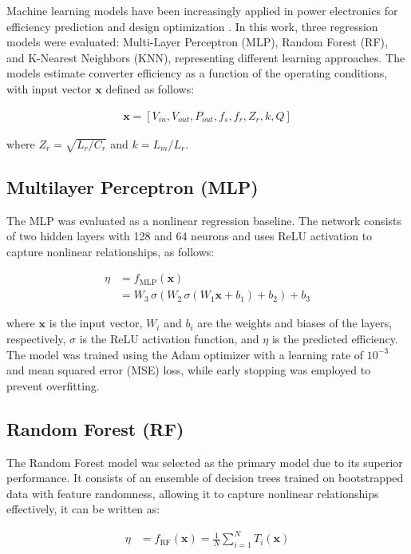 Machine learning models have been increasingly applied in power electronics for efficiency prediction and design optimization \cite{zhao2019}. In this work, three regression models were evaluated: Multi-Layer Perceptron (MLP), Random Forest (RF), and K-Nearest Neighbors (KNN), representing different learning approaches. The models estimate converter efficiency as a function of the operating conditions, with input vector $\mathbf{x}$ defined as follows:

\begin{align}
    \mathbf{x} = [V_{in}, V_{out}, P_{out}, f_s, f_r, Z_r, k, Q]
\end{align}

\noindent
where $Z_r = \sqrt{L_r/C_r}$ and $k = L_m / L_r$.

\subsection{Multilayer Perceptron (MLP)}

The MLP was evaluated as a nonlinear regression baseline. The network consists of two hidden layers with 128 and 64 neurons and uses ReLU activation to capture nonlinear relationships, as follows:

\begin{align}
\eta &= f_{\mathrm{MLP}}(\mathbf{x}) \nonumber \\
     &= W_3\,\sigma\!\left(W_2\,\sigma\!\left(W_1 \mathbf{x} + b_1\right) + b_2\right) + b_3
\end{align}

\noindent where $\mathbf{x}$ is the input vector, $W_i$ and $b_i$ are the weights and biases of the layers, respectively, $\sigma$ is the ReLU activation function, and $\eta$ is the predicted efficiency. The model was trained using the Adam optimizer with a learning rate of $10^{-3}$ and mean squared error (MSE) loss, while early stopping was employed to prevent overfitting.

\subsection{Random Forest (RF)}

The Random Forest model was selected as the primary model due to its superior performance. It consists of an ensemble of decision trees trained on bootstrapped data with feature randomness, allowing it to capture nonlinear relationships effectively, it can be written as:

\begin{align}
    \eta &= f_{\mathrm{RF}}(\mathbf{x}) = \frac{1}{N} \sum_{i=1}^{N} T_i(\mathbf{x})
\end{align}


